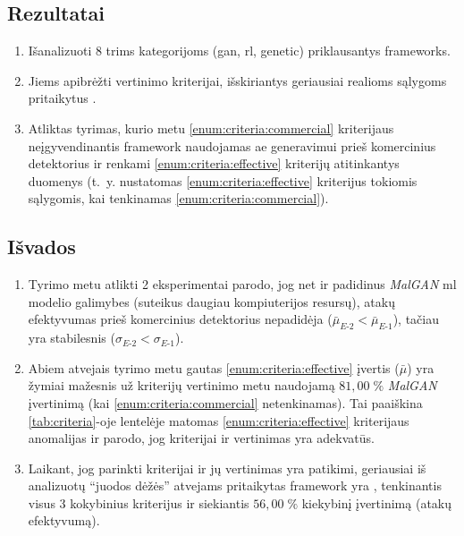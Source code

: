 
\subsection*{Rezultatai}
\begin{enumerate}
    \item Išanalizuoti 8 trims kategorijoms (\acs{gan}, \acs{rl}, \acs{genetic}) priklausantys  \glspl{framework}. 
    \item Jiems apibrėžti vertinimo kriterijai, išskiriantys geriausiai realioms sąlygoms pritaikytus .
    \item Atliktas tyrimas, kurio metu \ref{enum:criteria:commercial} kriterijaus neįgyvendinantis \gls{framework}  naudojamas \acs{ae} generavimui prieš komercinius detektorius ir renkami \ref{enum:criteria:effective} kriterijų atitinkantys duomenys (t.~y. nustatomas  \ref{enum:criteria:effective} kriterijus tokiomis sąlygomis, kai tenkinamas \ref{enum:criteria:commercial}).
\end{enumerate}

\subsection*{Išvados}
\begin{enumerate}
    \item Tyrimo metu atlikti 2 eksperimentai parodo, jog net ir padidinus \textit{MalGAN} \acs{ml} modelio galimybes (suteikus daugiau kompiuterijos resursų), atakų efektyvumas prieš komercinius detektorius nepadidėja ($\bar{\mu}_{E \text{-} 2} < \bar{\mu}_{E \text{-} 1}$), tačiau yra stabilesnis ($\sigma_{E \text{-} 2} < \sigma_{E \text{-} 1}$).
    \item Abiem atvejais tyrimo metu gautas \ref{enum:criteria:effective} įvertis ($\bar{\mu}$) yra žymiai mažesnis už kriterijų vertinimo metu naudojamą $81,00 \; \%$ \textit{MalGAN}  įvertinimą (kai \ref{enum:criteria:commercial} netenkinamas). Tai paaiškina \ref{tab:criteria}-oje lentelėje matomas \ref{enum:criteria:effective} kriterijaus anomalijas ir parodo, jog kriterijai ir  vertinimas yra adekvatūs.
    \item Laikant, jog parinkti kriterijai ir jų vertinimas yra patikimi, geriausiai iš analizuotų  \enquote{juodos dėžės} atvejams pritaikytas \gls{framework} yra , tenkinantis visus 3 kokybinius kriterijus ir siekiantis $56,00 \; \%$ kiekybinį įvertinimą (atakų efektyvumą).
\end{enumerate}
